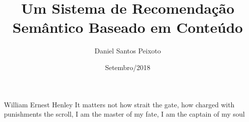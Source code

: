 \documentclass[pt,oneside,onehalfspacing,bsc]{risethesis}
\title{Um Sistema de Recomendação Semântico Baseado em Conteúdo}
\date{Setembro/2018}
\author{Daniel Santos Peixoto}
\begin{document}
\frontmatter
\frontpage
\presentationpage

\begin{epigraph}[]{William Ernest Henley}
It matters not how strait the gate, how charged with punishments the scroll, I am the master of my fate, I am the captain of my soul
\end{epigraph}

\resumo

\abstract


\tableofcontents
\listoffigures
\listoftables

\listofacronyms



\mainmatter










%
\end{document}
